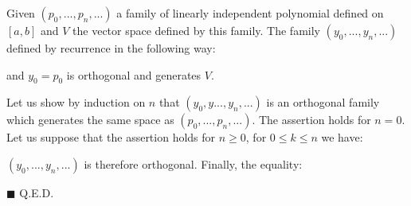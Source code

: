 	\begin{theorem}
	Given $(p_0,...,p_n,...)$ a family of linearly independent polynomial defined on $[a,b]$ and $V$ the vector space defined by this family. The family $(y_0,...,y_n,...)$ defined by recurrence in the following way:
	
	and $y_0=p_0$ is orthogonal and generates $V$.
	\end{theorem}
	\begin{dem}
	Let us show by induction on $n$ that $(y_0,y...,y_n,...)$ is an orthogonal family which generates the same space as $(p_0,...,p_n,...)$. The assertion holds for $n=0$. Let us suppose that the assertion holds for $n\geq 0$, for $0\leq k\leq n$ we have:
	
	$(y_0,...,y_n,...)$ is therefore orthogonal. Finally, the equality:	
	
	\begin{flushright}
		$\blacksquare$  Q.E.D.
	\end{flushright}
	\end{dem}
	
